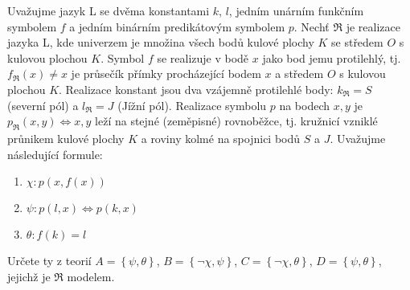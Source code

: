 Uvažujme jazyk L se dvěma konstantami $k$, $l$, jedním unárním funkčním symbolem
$f$ a jedním binárním predikátovým symbolem $p$. Nechť $\Re$ je realizace jazyka
L, kde univerzem je množina všech bodů kulové plochy $K$ se středem $O$ s
kulovou plochou $K$. Symbol $f$ se realizuje v bodě $x$ jako bod jemu
protilehlý, tj. $f_{\Re}(x) \neq x$ je průsečík přímky procházející bodem  $x$ a
středem $O$ s kulovou plochou $K$. Realizace konstant jsou dva vzájemně
protilehlé body: $k_{\Re} = S$ (severní pól) a $l_{\Re} = J$ (Jížní pól).
Realizace symbolu $p$ na bodech $x,y$ je $p_{\Re}(x,y) \Leftrightarrow x,y$
leží na stejné (zeměpisné) rovnoběžce, tj. kružnicí vzniklé průnikem kulové
plochy $K$ a roviny kolmé na spojnici bodů $S$ a $J$. Uvažujme následující
formule:
\begin{enumerate}[(1)]
  \item $\chi: p(x, f(x))$
  \item $\psi: p(l,x) \Leftrightarrow p(k,x)$
  \item $\theta: f(k) = l$
\end{enumerate}
Určete ty z teorií $A=\left \{ \psi, \theta \right \}$, $B=\left \{
\neg\chi,\psi \right \}$, $C=\left \{ \neg\chi, \theta \right \}$, $D= \left \{
\psi, \theta \right \}$, jejichž je $\Re$ modelem.
